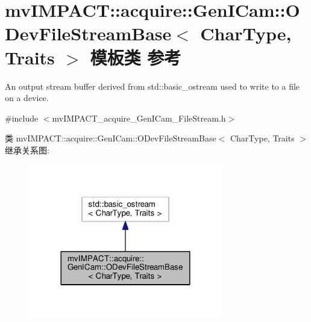 \hypertarget{classmv_i_m_p_a_c_t_1_1acquire_1_1_gen_i_cam_1_1_o_dev_file_stream_base}{\section{mv\+I\+M\+P\+A\+C\+T\+:\+:acquire\+:\+:Gen\+I\+Cam\+:\+:O\+Dev\+File\+Stream\+Base$<$ Char\+Type, Traits $>$ 模板类 参考}
\label{classmv_i_m_p_a_c_t_1_1acquire_1_1_gen_i_cam_1_1_o_dev_file_stream_base}
}


An output stream buffer derived from std\+::basic\+\_\+ostream used to write to a file on a device.  




{\ttfamily \#include $<$mv\+I\+M\+P\+A\+C\+T\+\_\+acquire\+\_\+\+Gen\+I\+Cam\+\_\+\+File\+Stream.\+h$>$}



类 mv\+I\+M\+P\+A\+C\+T\+:\+:acquire\+:\+:Gen\+I\+Cam\+:\+:O\+Dev\+File\+Stream\+Base$<$ Char\+Type, Traits $>$ 继承关系图\+:
\nopagebreak
\begin{figure}[H]
\begin{center}
\leavevmode
\includegraphics[width=240pt]{classmv_i_m_p_a_c_t_1_1acquire_1_1_gen_i_cam_1_1_o_dev_file_stream_base__inherit__graph}
\end{center}
\end{figure}


